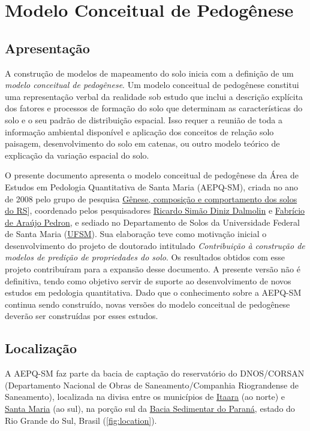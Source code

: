 \artigofalse
\chapter{Modelo Conceitual de Pedogênese}
\label{apen:pedogenesis}

\tocless\section{Apresentação}

A construção de modelos de mapeamento do solo inicia com a definição de um \textit{modelo conceitual
de pedogênese}. Um modelo conceitual de pedogênese constitui uma representação verbal da realidade 
sob estudo que inclui a descrição explícita dos fatores e processos de formação do solo que 
determinam as características do solo e o seu padrão de distribuição espacial. Isso requer a reunião
de toda a informação ambiental disponível e aplicação dos conceitos de relação solo paisagem, 
desenvolvimento do solo em catenas, ou outro modelo teórico de explicação da variação espacial do 
solo.

O presente documento apresenta o modelo conceitual de pedogênese da Área de Estudos em Pedologia 
Quantitativa de Santa Maria (AEPQ-SM), criada no ano de 2008 pelo grupo de pesquisa 
\href{dgp.cnpq.br/dgp/espelhogrupo/9373361709890764}{Gênese, composição e comportamento dos solos do
RS}], coordenado pelos pesquisadores \href{http://lattes.cnpq.br/3735884911693854}{Ricardo Simão 
Diniz Dalmolin} e \href{http://lattes.cnpq.br/6868334304493274}{Fabrício de Araújo Pedron}, e 
sediado no Departamento de Solos da Universidade Federal de Santa Maria 
(\href{http://site.ufsm.br/}{UFSM}). Sua elaboração teve como motivação inicial o desenvolvimento do
projeto de doutorado intitulado \textit{Contribuição à construção de modelos de predição de 
propriedades do solo}. Os resultados obtidos com esse projeto contribuíram para a expansão desse 
documento. A presente versão não é definitiva, tendo como objetivo servir de suporte ao 
desenvolvimento de novos estudos em pedologia quantitativa. Dado que o conhecimento sobre a AEPQ-SM 
continua sendo construído, novas versões do modelo conceitual de pedogênese deverão ser construídas 
por esses estudos.

\tocless\section{Localização}

A AEPQ-SM faz parte da bacia de captação do reservatório do DNOS/CORSAN (Departamento Nacional de 
Obras de Saneamento/Companhia Riograndense de Saneamento), localizada na divisa entre os municípios 
de \href{http://pt.wikipedia.org/wiki/Itaara}{Itaara} (ao norte) e 
\href{http://pt.wikipedia.org/wiki/Santa_Maria_\%28Rio_Grande_do_Sul\%29}{Santa Maria} (ao sul), na 
porção sul da \href{http://pt.wikipedia.org/wiki/Bacia_do_Paran\%C3\%A1}{Bacia Sedimentar do Paraná},
estado do Rio Grande do Sul, Brasil (\autoref{fig:location}).

